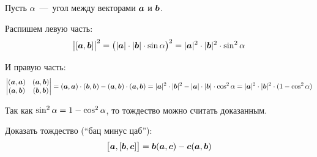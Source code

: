 \documentclass[a4paper,12pt]{article}
\begin{document}
  \begin{solution}
    Пусть $\alpha$~---~угол между векторами $\boldsymbol a$ и $\boldsymbol b$.
    
    Распишем левую часть:
    \[
      \bigl| [\boldsymbol a, \boldsymbol b] \bigr|^2
      = \bigl(|\boldsymbol a| \cdot |\boldsymbol b| \cdot \sin\alpha\bigr)^2
      = |\boldsymbol a|^2 \cdot |\boldsymbol b|^2 \cdot \sin^2\alpha
    \]
    
    И правую часть:
    \[
      \begin{vmatrix}
        (\boldsymbol a, \boldsymbol a) & (\boldsymbol a, \boldsymbol b)\\
        (\boldsymbol a, \boldsymbol b) & (\boldsymbol b, \boldsymbol b)
      \end{vmatrix}
      = (\boldsymbol a, \boldsymbol a) \cdot (\boldsymbol b, \boldsymbol b) - (\boldsymbol a, \boldsymbol b) \cdot (\boldsymbol a, \boldsymbol b)
      = |\boldsymbol a|^2 \cdot |\boldsymbol b|^2 - |\boldsymbol a| \cdot |\boldsymbol b| \cdot \cos^2\alpha
      = |\boldsymbol a|^2 \cdot |\boldsymbol b|^2 \cdot (1 - \cos^2\alpha)
    \]
    
    Так как $\sin^2\alpha \hm= 1 \hm- \cos^2\alpha$, то тождество можно считать доказанным.
  \end{solution}
  
  
  \begin{problem}[3.13(2)]
    Доказать тождество (``бац минус цаб''):
    \[
      \bigl[\boldsymbol a, [\boldsymbol b, \boldsymbol c]\bigr] = \boldsymbol b (\boldsymbol a, \boldsymbol c) - \boldsymbol c (\boldsymbol a, \boldsymbol b)
    \]
  \end{problem}
  
\end{document}
